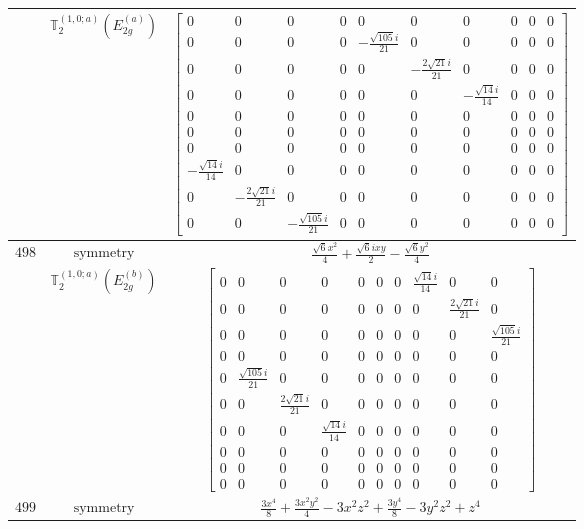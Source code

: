 \documentclass[fleqn,8pt,landscape]{jsarticle}
\begin{document}
\begin{longtable}{ccc}
$  $ & $ \mathbb{T}_{2}^{(1,0;a)}(E_{2g}^{(a)}) $ & $ \begin{bmatrix} 0 & 0 & 0 & 0 & 0 & 0 & 0 & 0 & 0 & 0 \\ 0 & 0 & 0 & 0 & - \frac{\sqrt{105} i}{21} & 0 & 0 & 0 & 0 & 0 \\ 0 & 0 & 0 & 0 & 0 & - \frac{2 \sqrt{21} i}{21} & 0 & 0 & 0 & 0 \\ 0 & 0 & 0 & 0 & 0 & 0 & - \frac{\sqrt{14} i}{14} & 0 & 0 & 0 \\ 0 & 0 & 0 & 0 & 0 & 0 & 0 & 0 & 0 & 0 \\ 0 & 0 & 0 & 0 & 0 & 0 & 0 & 0 & 0 & 0 \\ 0 & 0 & 0 & 0 & 0 & 0 & 0 & 0 & 0 & 0 \\ - \frac{\sqrt{14} i}{14} & 0 & 0 & 0 & 0 & 0 & 0 & 0 & 0 & 0 \\ 0 & - \frac{2 \sqrt{21} i}{21} & 0 & 0 & 0 & 0 & 0 & 0 & 0 & 0 \\ 0 & 0 & - \frac{\sqrt{105} i}{21} & 0 & 0 & 0 & 0 & 0 & 0 & 0 \end{bmatrix} $ \\ \hline
$ 498 $ & $ \text{symmetry} $ & $ \frac{\sqrt{6} x^{2}}{4} + \frac{\sqrt{6} i x y}{2} - \frac{\sqrt{6} y^{2}}{4} $ \\
$  $ & $ \mathbb{T}_{2}^{(1,0;a)}(E_{2g}^{(b)}) $ & $ \begin{bmatrix} 0 & 0 & 0 & 0 & 0 & 0 & 0 & \frac{\sqrt{14} i}{14} & 0 & 0 \\ 0 & 0 & 0 & 0 & 0 & 0 & 0 & 0 & \frac{2 \sqrt{21} i}{21} & 0 \\ 0 & 0 & 0 & 0 & 0 & 0 & 0 & 0 & 0 & \frac{\sqrt{105} i}{21} \\ 0 & 0 & 0 & 0 & 0 & 0 & 0 & 0 & 0 & 0 \\ 0 & \frac{\sqrt{105} i}{21} & 0 & 0 & 0 & 0 & 0 & 0 & 0 & 0 \\ 0 & 0 & \frac{2 \sqrt{21} i}{21} & 0 & 0 & 0 & 0 & 0 & 0 & 0 \\ 0 & 0 & 0 & \frac{\sqrt{14} i}{14} & 0 & 0 & 0 & 0 & 0 & 0 \\ 0 & 0 & 0 & 0 & 0 & 0 & 0 & 0 & 0 & 0 \\ 0 & 0 & 0 & 0 & 0 & 0 & 0 & 0 & 0 & 0 \\ 0 & 0 & 0 & 0 & 0 & 0 & 0 & 0 & 0 & 0 \end{bmatrix} $ \\ \hline
$ 499 $ & $ \text{symmetry} $ & $ \frac{3 x^{4}}{8} + \frac{3 x^{2} y^{2}}{4} - 3 x^{2} z^{2} + \frac{3 y^{4}}{8} - 3 y^{2} z^{2} + z^{4} $ \\

\end{longtable}
\end{document}
